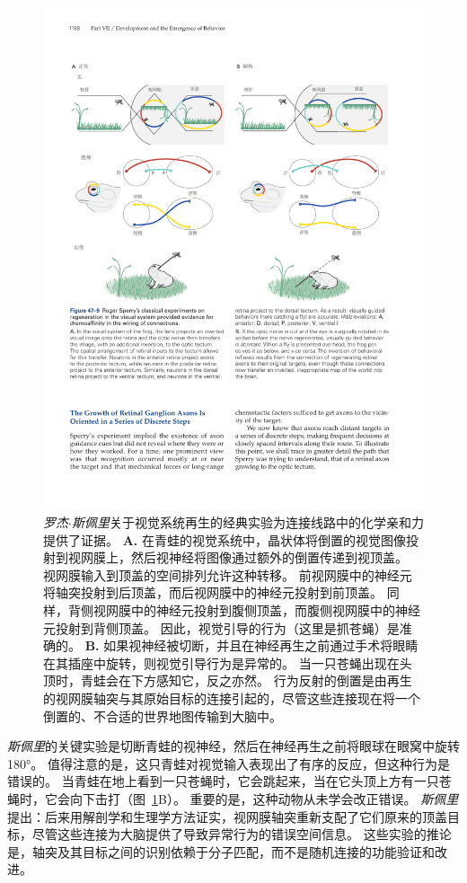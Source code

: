 \begin{figure}[htbp]
	\centering
	\includegraphics[width=1.0\linewidth]{chap47/fig_47_9}
	\caption{\textit{罗杰$\cdot$斯佩里}关于视觉系统再生的经典实验为连接线路中的化学亲和力提供了证据。
		\textbf{A.} 在青蛙的视觉系统中，晶状体将倒置的视觉图像投射到视网膜上，然后视神经将图像通过额外的倒置传递到视顶盖。
		视网膜输入到顶盖的空间排列允许这种转移。
		前视网膜中的神经元将轴突投射到后顶盖，而后视网膜中的神经元投射到前顶盖。
		同样，背侧视网膜中的神经元投射到腹侧顶盖，而腹侧视网膜中的神经元投射到背侧顶盖。
		因此，视觉引导的行为（这里是抓苍蝇）是准确的。
		\textbf{B.} 如果视神经被切断，并且在神经再生之前通过手术将眼睛在其插座中旋转，则视觉引导行为是异常的。
		当一只苍蝇出现在头顶时，青蛙会在下方感知它，反之亦然。
		行为反射的倒置是由再生的视网膜轴突与其原始目标的连接引起的，尽管这些连接现在将一个倒置的、不合适的世界地图传输到大脑中。}
	\label{fig:47_9}
\end{figure}


\textit{斯佩里}的关键实验是切断青蛙的视神经，然后在神经再生之前将眼球在眼窝中旋转 180°。
值得注意的是，这只青蛙对视觉输入表现出了有序的反应，但这种行为是错误的。
当青蛙在地上看到一只苍蝇时，它会跳起来，当在它头顶上方有一只苍蝇时，它会向下击打（图~\ref{fig:47_9}B）。
重要的是，这种动物从未学会改正错误。
\textit{斯佩里}提出：后来用解剖学和生理学方法证实，视网膜轴突重新支配了它们原来的顶盖目标，尽管这些连接为大脑提供了导致异常行为的错误空间信息。
这些实验的推论是，轴突及其目标之间的识别依赖于分子匹配，而不是随机连接的功能验证和改进。


